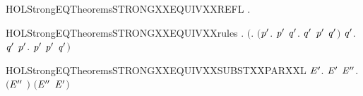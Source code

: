 \newcommand{\HOLStrongEQTheoremsSTRONGXXEQUIVXXPRESDXXBYXXSUM}{\UseVerbatim{HOLStrongEQTheoremsSTRONGXXEQUIVXXPRESDXXBYXXSUM}}
\begin{SaveVerbatim}{HOLStrongEQTheoremsSTRONGXXEQUIVXXREFL}
\HOLTokenTurnstile{} \HOLSymConst{\HOLTokenForall{}}.   
\end{SaveVerbatim}
\newcommand{\HOLStrongEQTheoremsSTRONGXXEQUIVXXREFL}{\UseVerbatim{HOLStrongEQTheoremsSTRONGXXEQUIVXXREFL}}
\begin{SaveVerbatim}{HOLStrongEQTheoremsSTRONGXXEQUIVXXrules}
\HOLTokenTurnstile{} \HOLSymConst{\HOLTokenForall{}} .
       \ensuremath{(}\HOLSymConst{\HOLTokenForall{}}.
            \ensuremath{(}\HOLSymConst{\HOLTokenForall{}}\ensuremath{\HOLBoundVar{p}\sp{\prime}}.  \HOLTokenTransBegin{}\HOLTokenTransEnd \ensuremath{\HOLBoundVar{p}\sp{\prime}} \HOLSymConst{\HOLTokenImp{}} \HOLSymConst{\HOLTokenExists{}}\ensuremath{\HOLBoundVar{q}\sp{\prime}}.  \HOLTokenTransBegin{}\HOLTokenTransEnd \ensuremath{\HOLBoundVar{q}\sp{\prime}} \HOLSymConst{\HOLTokenConj{}}  \ensuremath{\HOLBoundVar{p}\sp{\prime}} \ensuremath{\HOLBoundVar{q}\sp{\prime}}\ensuremath{)} \HOLSymConst{\HOLTokenConj{}}
            \HOLSymConst{\HOLTokenForall{}}\ensuremath{\HOLBoundVar{q}\sp{\prime}}.  \HOLTokenTransBegin{}\HOLTokenTransEnd \ensuremath{\HOLBoundVar{q}\sp{\prime}} \HOLSymConst{\HOLTokenImp{}} \HOLSymConst{\HOLTokenExists{}}\ensuremath{\HOLBoundVar{p}\sp{\prime}}.  \HOLTokenTransBegin{}\HOLTokenTransEnd \ensuremath{\HOLBoundVar{p}\sp{\prime}} \HOLSymConst{\HOLTokenConj{}}  \ensuremath{\HOLBoundVar{p}\sp{\prime}} \ensuremath{\HOLBoundVar{q}\sp{\prime}}\ensuremath{)} \HOLSymConst{\HOLTokenImp{}}
         
\end{SaveVerbatim}
\newcommand{\HOLStrongEQTheoremsSTRONGXXEQUIVXXrules}{\UseVerbatim{HOLStrongEQTheoremsSTRONGXXEQUIVXXrules}}
\begin{SaveVerbatim}{HOLStrongEQTheoremsSTRONGXXEQUIVXXSUBSTXXPARXXL}
\HOLTokenTurnstile{} \HOLSymConst{\HOLTokenForall{}} \ensuremath{\HOLBoundVar{E}\sp{\prime}}.
         \ensuremath{\HOLBoundVar{E}\sp{\prime}} \HOLSymConst{\HOLTokenImp{}}
       \HOLSymConst{\HOLTokenForall{}}\ensuremath{\HOLBoundVar{E}\sp{\prime\prime}}.  \ensuremath{(}\ensuremath{\HOLBoundVar{E}\sp{\prime\prime}} \HOLSymConst{\ensuremath{\mid}} \ensuremath{)} \ensuremath{(}\ensuremath{\HOLBoundVar{E}\sp{\prime\prime}} \HOLSymConst{\ensuremath{\mid}} \ensuremath{\HOLBoundVar{E}\sp{\prime}}\ensuremath{)}
\end{SaveVerbatim}
